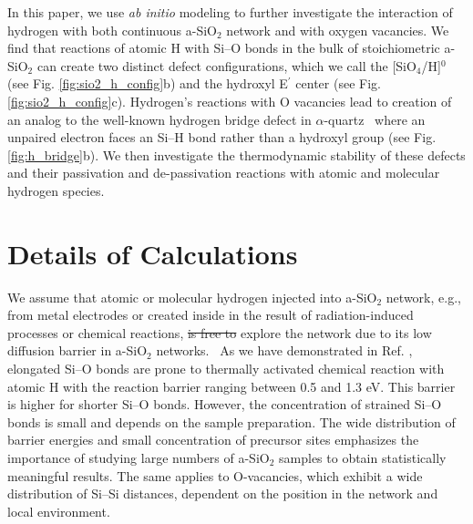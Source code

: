 \documentclass[aps,prb,reprint,superscriptaddress,showpacs]{revtex4-1}
\providecommand{\DIFadd}[1]{{\protect\color{blue}\uwave{#1}}} %
\providecommand{\DIFdel}[1]{{\protect\color{red}\sout{#1}}}                      %
\providecommand{\DIFaddbegin}{} %
\providecommand{\DIFaddend}{} %
\providecommand{\DIFdelbegin}{} %
\providecommand{\DIFdelend}{} %
\begin{document}
In this paper, we use \emph{ab initio} modeling to further investigate the interaction of hydrogen with both continuous a-SiO$_2$ network and with oxygen vacancies. We find that reactions of atomic H with \mbox{Si--O} bonds in the bulk of stoichiometric a-SiO$_2$ can create two distinct defect configurations, which we call the [SiO$_4$/H]$^0$ (see Fig. \ref{fig:sio2_h_config}b) and the hydroxyl E$^\prime$ center (see Fig. \ref{fig:sio2_h_config}c). Hydrogen's reactions with O vacancies lead to creation of an analog to the well-known hydrogen bridge defect in $\alpha$-quartz~\cite{blochl_vacancies,alkauskas_h} where an unpaired electron faces an \mbox{Si--H} bond rather than a hydroxyl group (see Fig. \ref{fig:h_bridge}b). We then investigate the thermodynamic stability of these defects and their passivation and de-passivation reactions with atomic and molecular hydrogen species. 

\section{Details of Calculations}
\label{sec:calc_details}

We assume that atomic or molecular hydrogen injected into a-SiO$_2$ network, e.g., from metal electrodes or created inside in the result of radiation-induced processes or chemical reactions, \DIFdelbegin \DIFdel{is free to }\DIFdelend \DIFaddbegin \DIFadd{can }\DIFaddend explore the network due to its low diffusion barrier in a-SiO$_2$ networks.~\cite{kajihara_hydrogen,skuja_hdiffusion} As we have demonstrated in Ref. \cite{aelsayed_prl}, elongated \mbox{Si--O} bonds are prone to thermally activated chemical reaction with atomic H with the reaction barrier ranging between 0.5 and 1.3 eV. This barrier is higher for shorter \mbox{Si--O} bonds. However, the concentration of strained \mbox{Si--O} bonds is small and depends on the sample preparation. The wide distribution of barrier energies and small concentration of precursor sites emphasizes the importance of studying large numbers of a-SiO$_2$ samples to obtain statistically meaningful results. The same applies to O-vacancies, which exhibit a wide distribution of \mbox{Si--Si} distances, dependent on the position in the network and local environment.~\cite{asio2_3}
\end{document}
